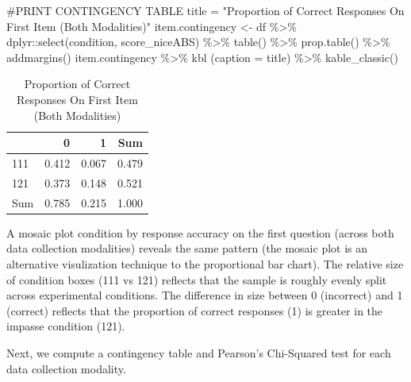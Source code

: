 \documentclass[
  letterpaper,
  DIV=11,
  numbers=noendperiod]{scrreprt}
\newenvironment{Shaded}{\begin{snugshade}}{\end{snugshade}}
\newcommand{\AttributeTok}[1]{\textcolor[rgb]{0.40,0.45,0.13}{#1}}
\newcommand{\CommentTok}[1]{\textcolor[rgb]{0.37,0.37,0.37}{#1}}
\newcommand{\FunctionTok}[1]{\textcolor[rgb]{0.28,0.35,0.67}{#1}}
\newcommand{\NormalTok}[1]{\textcolor[rgb]{0.00,0.23,0.31}{#1}}
\newcommand{\OtherTok}[1]{\textcolor[rgb]{0.00,0.23,0.31}{#1}}
\newcommand{\SpecialCharTok}[1]{\textcolor[rgb]{0.37,0.37,0.37}{#1}}
\newcommand{\StringTok}[1]{\textcolor[rgb]{0.13,0.47,0.30}{#1}}
\begin{document}
\begin{Shaded}
\begin{Highlighting}[]
\CommentTok{\#PRINT CONTINGENCY TABLE}
\NormalTok{title }\OtherTok{=} \StringTok{"Proportion of Correct Responses On First Item (Both Modalities)"}
\NormalTok{item.contingency }\OtherTok{\textless{}{-}}\NormalTok{  df }\SpecialCharTok{\%\textgreater{}\%}\NormalTok{ dplyr}\SpecialCharTok{::}\FunctionTok{select}\NormalTok{(condition, score\_niceABS) }\SpecialCharTok{\%\textgreater{}\%} \FunctionTok{table}\NormalTok{() }\SpecialCharTok{\%\textgreater{}\%} \FunctionTok{prop.table}\NormalTok{() }\SpecialCharTok{\%\textgreater{}\%} \FunctionTok{addmargins}\NormalTok{()}
\NormalTok{item.contingency }\SpecialCharTok{\%\textgreater{}\%} \FunctionTok{kbl}\NormalTok{ (}\AttributeTok{caption =}\NormalTok{ title) }\SpecialCharTok{\%\textgreater{}\%} \FunctionTok{kable\_classic}\NormalTok{()}
\end{Highlighting}
\end{Shaded}

\begin{table}

\caption{Proportion of Correct Responses On First Item (Both Modalities)}
\centering
\begin{tabular}[t]{l|r|r|r}
\hline
  & 0 & 1 & Sum\\
\hline
111 & 0.412 & 0.067 & 0.479\\
\hline
121 & 0.373 & 0.148 & 0.521\\
\hline
Sum & 0.785 & 0.215 & 1.000\\
\hline
\end{tabular}
\end{table}

A mosaic plot condition by response accuracy on the first question
(across both data collection modalities) reveals the same pattern (the
mosaic plot is an alternative visulization technique to the proportional
bar chart). The relative size of condition boxes (111 vs 121) reflects
that the sample is roughly evenly split across experimental conditions.
The difference in size between 0 (incorrect) and 1 (correct) reflects
that the proportion of correct responses (1) is greater in the impasse
condition (121).

Next, we compute a contingency table and Pearson's Chi-Squared test for
each data collection modality.
\end{document}
